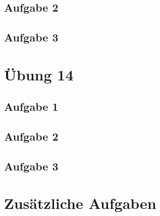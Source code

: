 \documentclass[a4paper]{article}
\begin{document}
\subsection{Aufgabe 2}
\textit{}


\subsection{Aufgabe 3}
\textit{}




\newpage
\section{Übung 14}
\subsection{Aufgabe 1}
\textit{}

\subsection{Aufgabe 2}
\textit{}


\subsection{Aufgabe 3}
\textit{}




\newpage
\section{Zusätzliche Aufgaben}
\end{document}
